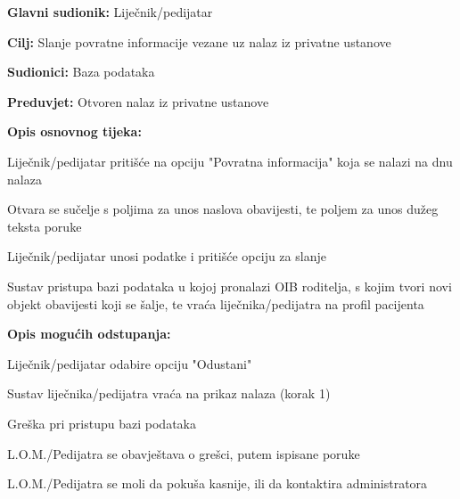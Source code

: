 					\noindent {}
					\begin{packed_item}
						
						\item \textbf{Glavni sudionik: }Liječnik/pedijatar
						\item  \textbf{Cilj:} Slanje povratne informacije vezane uz nalaz iz privatne ustanove
						\item  \textbf{Sudionici:} Baza podataka
						\item  \textbf{Preduvjet:} Otvoren nalaz iz privatne ustanove
						\item  \textbf{Opis osnovnog tijeka:}
						
						\item[] \begin{packed_enum}
							
							\item Liječnik/pedijatar pritišće na opciju "Povratna informacija" koja se nalazi na dnu nalaza
							\item Otvara se sučelje s poljima za unos naslova obavijesti, te poljem za unos dužeg teksta poruke
							\item Liječnik/pedijatar unosi podatke i pritišće opciju za slanje
							\item Sustav pristupa bazi podataka u kojoj pronalazi OIB roditelja, s kojim tvori novi objekt obavijesti koji se šalje, te vraća liječnika/pedijatra na profil pacijenta
						\end{packed_enum}
						\item \textbf{Opis mogućih odstupanja:}
						\item[] \begin{packed_item}
							\item[3.a] Liječnik/pedijatar odabire opciju "Odustani"
							\item[] \begin{packed_enum}
								\item Sustav liječnika/pedijatra vraća na prikaz nalaza (korak 1)
							\end{packed_enum}
							\item[4.a] Greška pri pristupu bazi podataka
							\item[] \begin{packed_enum}
								
								\item L.O.M./Pedijatra se obavještava o grešci, putem ispisane poruke
								\item L.O.M./Pedijatra se moli da pokuša kasnije, ili da kontaktira administratora
								
							\end{packed_enum}
						\end{packed_item}
					\end{packed_item}
					
